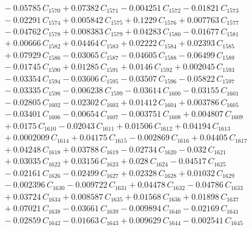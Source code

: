 \documentclass[a4paper,11pt]{article}
\begin{document}
\begin{align}
&\quad - 0.05785\,C_{1570} + 0.07382\,C_{1571} - 0.004251\,C_{1572} - 0.01821\,C_{1573} \nonumber\\
&\quad - 0.02291\,C_{1574} + 0.005842\,C_{1575} + 0.1229\,C_{1576} + 0.007763\,C_{1577} \nonumber\\
&\quad - 0.04762\,C_{1578} + 0.008383\,C_{1579} + 0.04283\,C_{1580} - 0.01677\,C_{1581} \nonumber\\
&\quad + 0.00666\,C_{1582} + 0.04464\,C_{1583} + 0.02222\,C_{1584} + 0.02393\,C_{1585} \nonumber\\
&\quad + 0.07929\,C_{1586} - 0.03065\,C_{1587} - 0.04605\,C_{1588} - 0.06499\,C_{1589} \nonumber\\
&\quad - 0.01745\,C_{1590} + 0.01285\,C_{1591} + 0.0146\,C_{1592} + 0.002045\,C_{1593} \nonumber\\
&\quad - 0.03354\,C_{1594} - 0.03606\,C_{1595} - 0.03507\,C_{1596} - 0.05822\,C_{1597} \nonumber\\
&\quad - 0.03335\,C_{1598} - 0.006238\,C_{1599} - 0.03614\,C_{1600} - 0.03155\,C_{1601} \nonumber\\
&\quad - 0.02805\,C_{1602} - 0.02302\,C_{1603} + 0.01412\,C_{1604} + 0.003786\,C_{1605} \nonumber\\
&\quad - 0.03401\,C_{1606} - 0.00654\,C_{1607} - 0.003751\,C_{1608} + 0.004807\,C_{1609} \nonumber\\
&\quad + 0.0175\,C_{1610} - 0.02043\,C_{1611} + 0.01506\,C_{1612} + 0.04194\,C_{1613} \nonumber\\
&\quad + 0.0002009\,C_{1614} + 0.04175\,C_{1615} - 0.002869\,C_{1616} + 0.04405\,C_{1617} \nonumber\\
&\quad + 0.04248\,C_{1618} + 0.03788\,C_{1619} - 0.02734\,C_{1620} - 0.032\,C_{1621} \nonumber\\
&\quad + 0.03035\,C_{1622} + 0.03156\,C_{1623} + 0.028\,C_{1624} - 0.04517\,C_{1625} \nonumber\\
&\quad - 0.02161\,C_{1626} - 0.02499\,C_{1627} + 0.02328\,C_{1628} + 0.01032\,C_{1629} \nonumber\\
&\quad - 0.002396\,C_{1630} - 0.009722\,C_{1631} + 0.04478\,C_{1632} - 0.04786\,C_{1633} \nonumber\\
&\quad + 0.03724\,C_{1634} + 0.008587\,C_{1635} + 0.01568\,C_{1636} + 0.01898\,C_{1637} \nonumber\\
&\quad + 0.07021\,C_{1638} - 0.03661\,C_{1639} - 0.009894\,C_{1640} - 0.02169\,C_{1641} \nonumber\\
&\quad - 0.02859\,C_{1642} - 0.01663\,C_{1643} + 0.009629\,C_{1644} - 0.002541\,C_{1645} \nonumber\\

\end{align}
\end{document}

